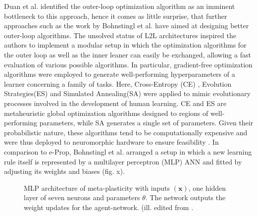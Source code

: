 \documentclass[letterpaper, 10 pt, conference]{ieeeconf}  %
\begin{document}
Duan et al.\cite{duanOneShotImitationLearning2017} identified the outer-loop optimization algorithm as an imminent 
bottleneck to this approach, hence it comes as 
little surprise, that further approaches such as the work by Bohnstingl et al.\cite{bohnstinglNeuromorphicHardwareLearns2019}
 have aimed at designing better outer-loop algorithms.
The unsolved status of L2L architectures inspired the authors to implement a modular setup in which the optimization algorithms
for the outer loop as well as the inner leaner can easily be exchanged, allowing a fast evaluation of various possible algorithms. In 
particular, gradient-free optimization algorithms were employed to generate well-performing hyperparameters of a learner concerning a 
family of tasks. Here, Cross-Entropy (CE) \cite{botevCrossEntropyMethodOptimization2013}, Evolution Strategies(ES)
\cite{beyerEvolutionStrategiesComprehensive2002} and Simulated Annealing(SA)\cite{kirkpatrickOptimizationSimulatedAnnealing1983}
were applied to mimic evolutionary 
processes involved in the development of human learning. CE and ES are metaheuristic global optimization algorithms designed to regions of 
well-performing parameters, while SA generates a single set of parameters. Given their probabilistic nature, these algorithms tend to be 
computationally expensive and were thus deployed to neuromorphic hardware to ensure feasibility \cite{bohnstinglNeuromorphicHardwareLearns2019}.
In comparison to e-Prop, 
Bohnstingl et al. arranged a setup in which a new learning rule itself is represented by a multilayer perceptron (MLP) ANN and fitted by 
adjusting its weights and biases (fig. x). 

\begin{figure}[thpb]
        \centering
  \caption{ MLP architecture of meta-plasticity with inputs $\mathbf{(x)}$, one hidden layer of seven neurons and parameters $\theta$. 
  The network outputs the weight updates for the agent-network.
  (ill. edited from \cite{bohnstinglNeuromorphicHardwareLearns2019}.
  }
        \label{figurelabel}
     \end{figure}
\end{document}
